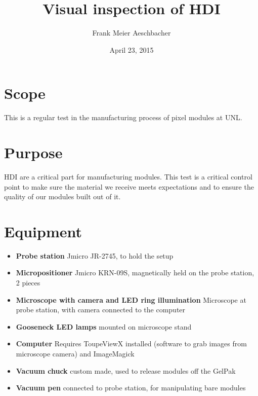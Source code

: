 \documentclass[12pt]{unlsilabsop}
\title{Visual inspection of HDI}
\date{April 23, 2015}
\author{Frank Meier Aeschbacher}
\begin{document}
\maketitle

\section{Scope}
This is a regular test in the manufacturing process of pixel modules at UNL.

\section{Purpose}
HDI are a critical part for manufacturing modules. This test is a critical control point to make sure the material we receive meets expectations and to ensure the quality of our modules built out of it.



\section{Equipment}

\begin{itemize}
\item \textbf{Probe station} Jmicro JR-2745, to hold the setup
\item \textbf{Micropositioner} Jmicro KRN-09S, magnetically held on the probe station, 2 pieces
\item \textbf{Microscope with camera and LED ring illumination} Microscope at probe station, with camera connected to the computer
\item \textbf{Gooseneck LED lamps} mounted on microscope stand
\item \textbf{Computer} Requires ToupeViewX installed (software to grab images from microscope camera) and ImageMagick
\item \textbf{Vacuum chuck} custom made, used to release modules off the GelPak
\item \textbf{Vacuum pen} connected to probe station, for manipulating bare modules
\end{itemize}
\end{document}
